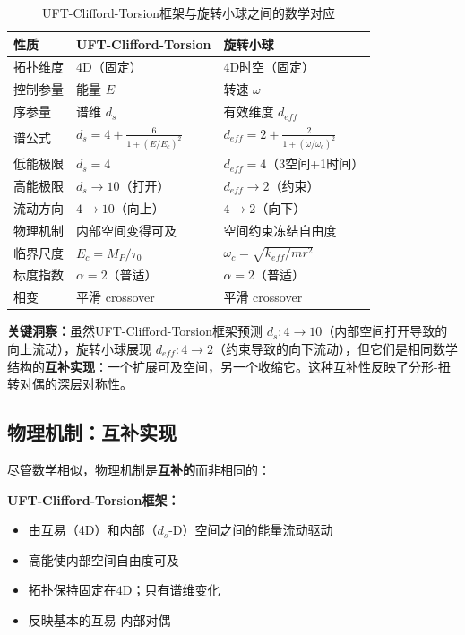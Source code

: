 \documentclass[12pt,a4paper]{article}
\begin{document}
\begin{table}[h]
\centering
\begin{tabular}{p{4cm}p{5cm}p{5cm}}
\toprule
\textbf{性质} & \textbf{UFT-Clifford-Torsion} & \textbf{旋转小球} \\
\midrule
拓扑维度 & 4D（固定） & 4D时空（固定） \\
控制参量 & 能量 $E$ & 转速 $\omega$ \\
序参量 & 谱维 $d_s$ & 有效维度 $d_{eff}$ \\
谱公式 & $d_s = 4 + \frac{6}{1+(E/E_c)^2}$ & $d_{eff} = 2 + \frac{2}{1+(\omega/\omega_c)^2}$ \\
低能极限 & $d_s = 4$ & $d_{eff} = 4$（3空间+1时间） \\
高能极限 & $d_s \to 10$（打开） & $d_{eff} \to 2$（约束） \\
流动方向 & $4 \to 10$（向上） & $4 \to 2$（向下） \\
物理机制 & 内部空间变得可及 & 空间约束冻结自由度 \\
临界尺度 & $E_c = M_P/\tau_0$ & $\omega_c = \sqrt{k_{eff}/mr^2}$ \\
标度指数 & $\alpha = 2$（普适） & $\alpha = 2$（普适） \\
相变 & 平滑 crossover & 平滑 crossover \\
\bottomrule
\end{tabular}
\caption{UFT-Clifford-Torsion框架与旋转小球之间的数学对应}
\label{tab:correspondence}
\end{table}

\textbf{关键洞察：}虽然UFT-Clifford-Torsion框架预测 $d_s: 4 \to 10$（内部空间打开导致的向上流动），旋转小球展现 $d_{eff}: 4 \to 2$（约束导致的向下流动），但它们是相同数学结构的\textbf{互补实现}：一个扩展可及空间，另一个收缩它。这种互补性反映了分形-扭转对偶的深层对称性。

\subsection{物理机制：互补实现}

尽管数学相似，物理机制是\textbf{互补的}而非相同的：

\textbf{UFT-Clifford-Torsion框架：}
\begin{itemize}
    \item 由互易（4D）和内部（$d_s$-D）空间之间的能量流动驱动
    \item 高能使内部空间自由度可及
    \item 拓扑保持固定在4D；只有谱维变化
    \item 反映基本的互易-内部对偶
\end{itemize}
\end{document}
